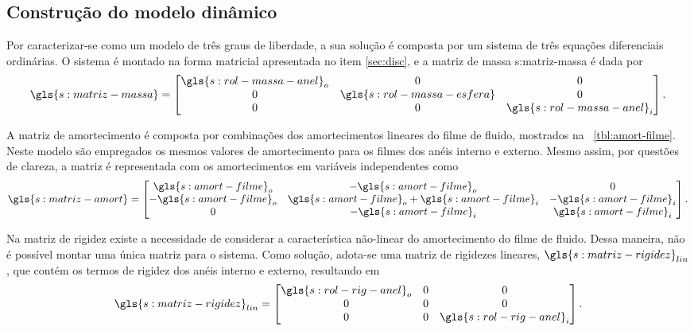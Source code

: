 \documentclass[12pt,oneside,english,brazil,lmodern,siglas,simbolos,cite=num]{ucsmonograph}
\begin{document}
	\begin{figure}[b]
		\label{fig:modelo-impulsos}
	\end{figure}

	\subsection{Construção do modelo dinâmico}
	Por caracterizar-se como um modelo de três graus de liberdade, a sua solução é composta por um sistema de três equações diferenciais ordinárias.
	O sistema é montado na forma matricial apresentada no item \ref{sec:disc}, e a matriz de massa \gls{s:matriz-massa} é dada por
	\begin{equation*}
		\gls{s:matriz-massa} =
	\begin{bmatrix}
		\gls{s:rol-massa-anel}_o	&	0	&	0\\
		0	&	\gls{s:rol-massa-esfera}	&	0\\
		0	&	0	&	\gls{s:rol-massa-anel}_i
	\end{bmatrix}.
	\end{equation*}
	
	A matriz de amortecimento é composta por combinações dos amortecimentos lineares do filme de fluido, mostrados na \tablename\ \ref{tbl:amort-filme}.
	Neste modelo são empregados os mesmos valores de amortecimento para os filmes dos anéis interno e externo.
	Mesmo assim, por questões de clareza, a matriz é representada com os amortecimentos em variáveis independentes como
	\begin{equation*}
		\gls{s:matriz-amort} = 
	\begin{bmatrix}
		\gls{s:amort-filme}_o & -\gls{s:amort-filme}_o & 0\\
		-\gls{s:amort-filme}_o & \gls{s:amort-filme}_o +
		\gls{s:amort-filme}_i & -\gls{s:amort-filme}_i\\
		0 & -\gls{s:amort-filme}_i & \gls{s:amort-filme}_i
	\end{bmatrix}.
	\end{equation*}
	
	Na matriz de rigidez existe a necessidade de considerar a característica não-linear do amortecimento do filme de fluido.
	Dessa maneira, não é possível montar uma única matriz para o sistema.
	Como solução, adota-se uma matriz de rigidezes lineares, $\gls{s:matriz-rigidez}_{lin}$, que contém os termos de rigidez dos anéis interno e externo, resultando em
	\begin{equation*}
		\gls{s:matriz-rigidez}_{lin} =
	\begin{bmatrix}
		\gls{s:rol-rig-anel}_o	&	0	&	0\\
		0	&	0	&	0\\
		0	&	0	&	\gls{s:rol-rig-anel}_i
	\end{bmatrix}.
	\end{equation*}
	
\end{document}
